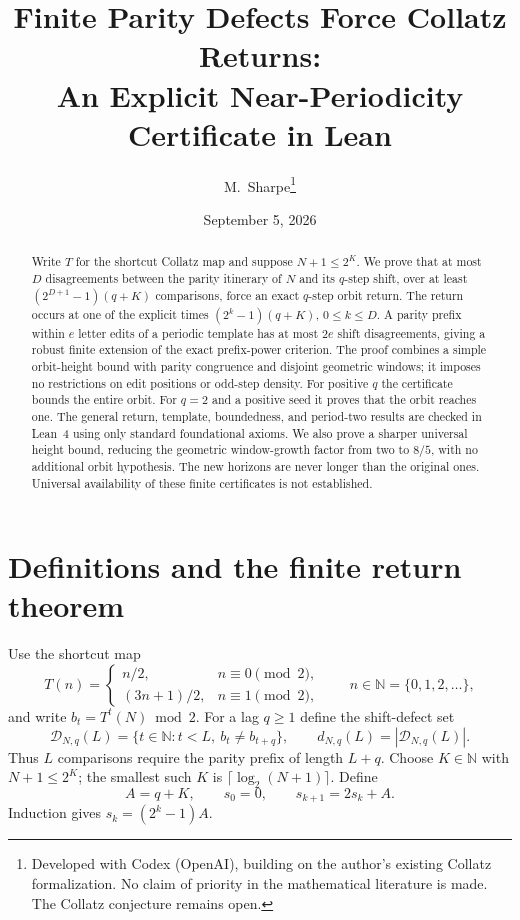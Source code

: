 \documentclass[11pt]{article}
\title{Finite Parity Defects Force Collatz Returns:\\
An Explicit Near-Periodicity Certificate in Lean}
\author{M.~Sharpe\thanks{Developed with Codex (OpenAI), building on the author's existing Collatz formalization. No claim of priority in the mathematical literature is made. The Collatz conjecture remains open.}}
\date{September 5, 2026}
\newcommand{\N}{\mathbb N}
\begin{document}
\maketitle
\begin{abstract}
Write $T$ for the shortcut Collatz map and suppose $N+1\le2^K$.
We prove that at most $D$ disagreements between the parity itinerary of
$N$ and its $q$-step shift, over at least
$(2^{D+1}-1)(q+K)$ comparisons, force an exact $q$-step orbit return.
The return occurs at one of the explicit times
$(2^k-1)(q+K)$, $0\le k\le D$.
A parity prefix within $e$ letter edits of a periodic template has at
most $2e$ shift disagreements, giving a robust finite extension of the
exact prefix-power criterion. The proof combines a simple orbit-height
bound with parity congruence and disjoint geometric windows; it imposes
no restrictions on edit positions or odd-step density.
For positive $q$ the certificate bounds the entire orbit. For $q=2$
and a positive seed it proves that the orbit reaches one. The general
return, template, boundedness, and period-two results are checked in
Lean~4 using only standard foundational axioms. We also prove a sharper
universal height bound, reducing the geometric window-growth factor from
two to $8/5$, with no additional orbit hypothesis. The new horizons are
never longer than the original ones. Universal availability of these
finite certificates is not established.
\end{abstract}

\section{Definitions and the finite return theorem}
Use the shortcut map
\[
T(n)=\begin{cases}n/2,&n\equiv0\pmod2,\\(3n+1)/2,&n\equiv1\pmod2,\end{cases}
\qquad n\in\N=\{0,1,2,\ldots\},
\]
and write $b_t=T^t(N)\bmod2$. For a lag $q\ge1$ define the shift-defect set
\begin{equation}\label{eq:defects}
\mathcal D_{N,q}(L)=\{t\in\N: t<L,\ b_t\ne b_{t+q}\},\qquad
d_{N,q}(L)=|\mathcal D_{N,q}(L)|.
\end{equation}
Thus $L$ comparisons require the parity prefix of length $L+q$.
Choose $K\in\N$ with $N+1\le2^K$; the smallest such $K$ is
$\lceil\log_2(N+1)\rceil$. Define
\begin{equation}\label{eq:checkpoints}
A=q+K,\qquad s_0=0,\qquad s_{k+1}=2s_k+A.
\end{equation}
Induction gives $s_k=(2^k-1)A$.
\end{document}
